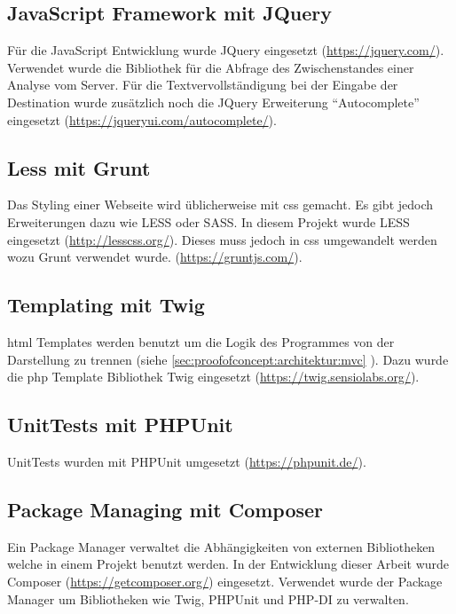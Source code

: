 \subsection{JavaScript Framework mit JQuery}
Für die JavaScript Entwicklung wurde JQuery eingesetzt (\url{https://jquery.com/}). Verwendet wurde die Bibliothek für die Abfrage des Zwischenstandes einer Analyse vom Server. Für die Textvervollständigung bei der Eingabe der Destination wurde zusätzlich noch die JQuery Erweiterung "`Autocomplete"' eingesetzt (\url{https://jqueryui.com/autocomplete/}).

\subsection{Less mit Grunt}
Das Styling einer Webseite wird üblicherweise mit \gls{css} gemacht. Es gibt jedoch Erweiterungen dazu wie LESS oder SASS. In diesem Projekt wurde LESS eingesetzt (\url{http://lesscss.org/}). Dieses muss jedoch in \gls{css} umgewandelt werden wozu Grunt verwendet wurde. (\url{https://gruntjs.com/}).

\subsection{Templating mit Twig}
\label{sec:proofofconcept:externebibliotheken:twig}
\gls{html} Templates werden benutzt um die Logik des Programmes von der Darstellung zu trennen (siehe \cref{sec:proofofconcept:architektur:mvc} ). Dazu wurde die \gls{php} Template Bibliothek Twig eingesetzt (\url{https://twig.sensiolabs.org/}).

\subsection{UnitTests mit PHPUnit}
\label{sec:proofofconcept:externebibliotheken:phpunit}
UnitTests wurden mit PHPUnit umgesetzt (\url{https://phpunit.de/}).

\subsection{Package Managing mit Composer}
Ein Package Manager verwaltet die Abhängigkeiten von externen Bibliotheken welche in einem Projekt benutzt werden. In der Entwicklung dieser Arbeit wurde Composer (\url{https://getcomposer.org/}) eingesetzt. Verwendet wurde der Package Manager um Bibliotheken wie Twig, PHPUnit und PHP-DI zu verwalten.

